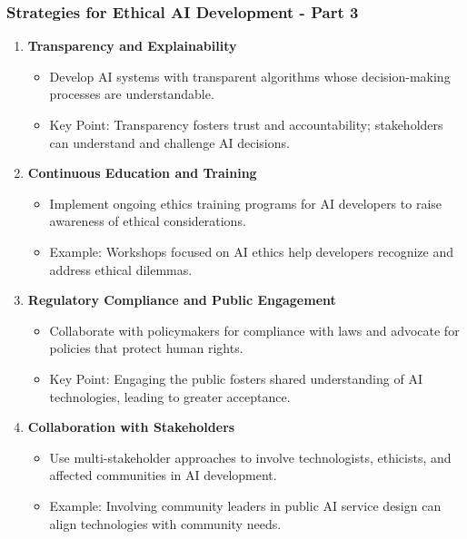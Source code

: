 \documentclass[aspectratio=169]{beamer}
\begin{document}
\begin{frame}[fragile]
    \frametitle{Strategies for Ethical AI Development - Part 3}
    \begin{enumerate}[resume]
        \item \textbf{Transparency and Explainability}
            \begin{itemize}
                \item Develop AI systems with transparent algorithms whose decision-making processes are understandable.
                \item Key Point: Transparency fosters trust and accountability; stakeholders can understand and challenge AI decisions.
            \end{itemize}

        \item \textbf{Continuous Education and Training}
            \begin{itemize}
                \item Implement ongoing ethics training programs for AI developers to raise awareness of ethical considerations.
                \item Example: Workshops focused on AI ethics help developers recognize and address ethical dilemmas.
            \end{itemize}

        \item \textbf{Regulatory Compliance and Public Engagement}
            \begin{itemize}
                \item Collaborate with policymakers for compliance with laws and advocate for policies that protect human rights.
                \item Key Point: Engaging the public fosters shared understanding of AI technologies, leading to greater acceptance.
            \end{itemize}
        
        \item \textbf{Collaboration with Stakeholders}
            \begin{itemize}
                \item Use multi-stakeholder approaches to involve technologists, ethicists, and affected communities in AI development.
                \item Example: Involving community leaders in public AI service design can align technologies with community needs.
            \end{itemize}
    \end{enumerate}
\end{frame}
\end{document}
